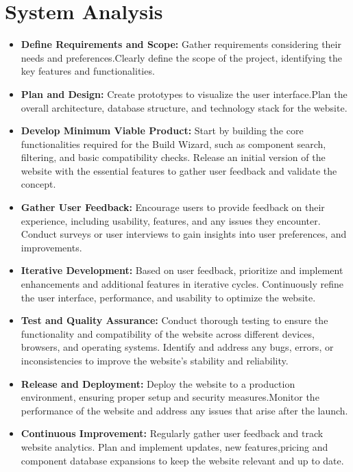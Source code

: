 \section{System Analysis}
   \begin{itemize}  
      \item \textbf{Define Requirements and Scope:}
      Gather requirements  considering their needs and preferences.Clearly define the scope of the project, identifying the key features and functionalities.
      \item \textbf{Plan and Design:}
      Create prototypes to visualize the user interface.Plan the overall architecture, database structure, and technology stack for the website.
      \item \textbf{Develop Minimum Viable Product:}
      Start by building the core functionalities required for the Build Wizard, such as component search, filtering, and basic compatibility checks.
      Release an initial version of the website with the essential features to gather user feedback and validate the concept.
      
      \item \textbf{Gather User Feedback:}
      Encourage users to provide feedback on their experience, including usability, features, and any issues they encounter.
      Conduct surveys or user interviews to gain insights into user preferences, and improvements.
      
      \item \textbf{Iterative Development:}
      Based on user feedback, prioritize and implement enhancements and additional features in iterative cycles.
      Continuously refine the user interface, performance, and usability to optimize the website.
      
      \item \textbf{Test and Quality Assurance:}
      Conduct thorough testing to ensure the functionality and compatibility of the website across different devices, browsers, and operating systems.
      Identify and address any bugs, errors, or inconsistencies to improve the website's stability and reliability.
      \item \textbf{Release and Deployment:}
      Deploy the website to a production environment, ensuring proper setup and security measures.Monitor the performance of the website and address any issues that arise after the launch.
      
      \item \textbf{Continuous Improvement:}
      Regularly gather user feedback and track website analytics.
      Plan and implement updates, new features,pricing and component database expansions to keep the website relevant and up to date.
   \end{itemize}

